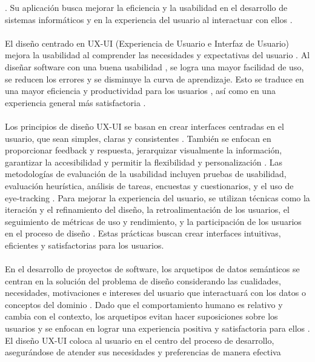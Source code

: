 \documentclass[12pt,a4paper]{article}
\begin{document}
\cite{Batini1992}
\cite{Baruch2017}
. Su aplicación busca mejorar la eficiencia y la usabilidad en el desarrollo de sistemas informáticos y en la experiencia del usuario al interactuar con ellos
\cite{Safina2016}
\cite{CardosodeMoraes2016}
. 
\\\\
El diseño centrado en UX-UI (Experiencia de Usuario e Interfaz de Usuario) mejora la usabilidad al comprender las necesidades y expectativas del usuario
\cite{Kopanitsa2015}
\cite{Cosenz2017}
\cite{Vaclav2017}
. Al diseñar software con una buena usabilidad
\cite{Cosenz2017}
, se logra una mayor facilidad de uso, se reducen los errores y se disminuye la curva de aprendizaje. Esto se traduce en una mayor eficiencia y productividad para los usuarios
\cite{Ferreira2017}
, así como en una experiencia general más satisfactoria
\cite{Vaclav2017}
. 
\\\\
Los principios de diseño UX-UI se basan en crear interfaces centradas en el usuario, que sean simples, claras y consistentes
\cite{Stacey2017}
. También se enfocan en proporcionar feedback y respuesta, jerarquizar visualmente la información, garantizar la accesibilidad y permitir la flexibilidad y personalización
\cite{Upadhyay2023}
\cite{Moner2018}
. Las metodologías de evaluación de la usabilidad incluyen pruebas de usabilidad, evaluación heurística, análisis de tareas, encuestas y cuestionarios, y el uso de eye-tracking
\cite{Epifanio2016}
. Para mejorar la experiencia del usuario, se utilizan técnicas como la iteración y el refinamiento del diseño, la retroalimentación de los usuarios, el seguimiento de métricas de uso y rendimiento, y la participación de los usuarios en el proceso de diseño
\cite{Upadhyay2023}
\cite{Rasmussen2014}
. Estas prácticas buscan crear interfaces intuitivas, eficientes y satisfactorias para los usuarios.
\\\\
En el desarrollo de proyectos de software, los arquetipos de datos semánticos se centran en la solución del problema de diseño considerando las cualidades, necesidades, motivaciones e intereses del usuario que interactuará con los datos o conceptos del dominio
\cite{MartínezCosta2011}
\cite{Klock2017}
\cite{Hassan2017}
. Dado que el comportamiento humano es relativo y cambia con el contexto, los arquetipos evitan hacer suposiciones sobre los usuarios y se enfocan en lograr una experiencia positiva y satisfactoria para ellos
\cite{Martins1990}
\cite{Hassan2016}
. El diseño UX-UI coloca al usuario en el centro del proceso de desarrollo, asegurándose de atender sus necesidades y preferencias de manera efectiva
\end{document}

